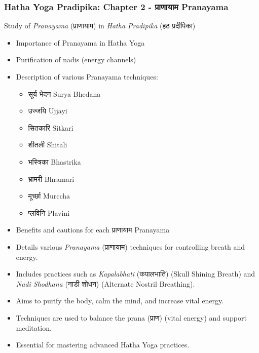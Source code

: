 
\begin{frame}[fragile]\frametitle{Hatha Yoga Pradipika: Chapter 2 - प्राणायाम  Pranayama}
Study of \textit{Pranayama} (प्राणायाम) in \textit{Hatha Pradipika} (हठ प्रदीपिका)

\begin{itemize}
    \item Importance of Pranayama in Hatha Yoga
    \item Purification of nadis (energy channels)
    \item Description of various Pranayama techniques:
    \begin{itemize}
        \item सूर्य भेदन Surya Bhedana
        \item उज्जयि Ujjayi
        \item सितकारि Sitkari
        \item शीतली Shitali
        \item भस्त्रिका Bhastrika
        \item भ्रामरी Bhramari
        \item मूर्च्छा Murccha
        \item प्लविनि Plavini
    \end{itemize}
    \item Benefits and cautions for each प्राणायाम Pranayama
	\item Details various \textit{Pranayama} (प्राणायाम) techniques for controlling breath and energy.
	\item Includes practices such as \textit{Kapalabhati} (कपालभाति) (Skull Shining Breath) and \textit{Nadi Shodhana} (नाडी शोधन) (Alternate Nostril Breathing).
	\item Aims to purify the body, calm the mind, and increase vital energy.
	\item Techniques are used to balance the prana (प्राण) (vital energy) and support meditation.
	\item Essential for mastering advanced Hatha Yoga practices.
  \end{itemize}

\end{frame}


